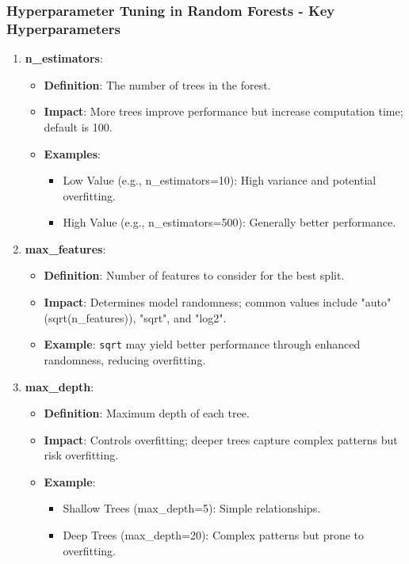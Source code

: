 \documentclass[aspectratio=169]{beamer}
\begin{document}
\begin{frame}[fragile]
    \frametitle{Hyperparameter Tuning in Random Forests - Key Hyperparameters}
    \begin{enumerate}
        \item \textbf{n\_estimators}:
            \begin{itemize}
                \item \textbf{Definition}: The number of trees in the forest.
                \item \textbf{Impact}: More trees improve performance but increase computation time; default is 100.

                \item \textbf{Examples}:
                  \begin{itemize}
                      \item Low Value (e.g., n\_estimators=10): High variance and potential overfitting.
                      \item High Value (e.g., n\_estimators=500): Generally better performance.
                  \end{itemize}
            \end{itemize}

        \item \textbf{max\_features}:
            \begin{itemize}
                \item \textbf{Definition}: Number of features to consider for the best split.
                \item \textbf{Impact}: Determines model randomness; common values include "auto" (sqrt(n\_features)), "sqrt", and "log2".
                \item \textbf{Example}: \texttt{sqrt} may yield better performance through enhanced randomness, reducing overfitting.
            \end{itemize}

        \item \textbf{max\_depth}:
            \begin{itemize}
                \item \textbf{Definition}: Maximum depth of each tree.
                \item \textbf{Impact}: Controls overfitting; deeper trees capture complex patterns but risk overfitting.
                \item \textbf{Example}: 
                  \begin{itemize}
                      \item Shallow Trees (max\_depth=5): Simple relationships.
                      \item Deep Trees (max\_depth=20): Complex patterns but prone to overfitting.
                  \end{itemize}
            \end{itemize}
    \end{enumerate}
\end{frame}
\end{document}
